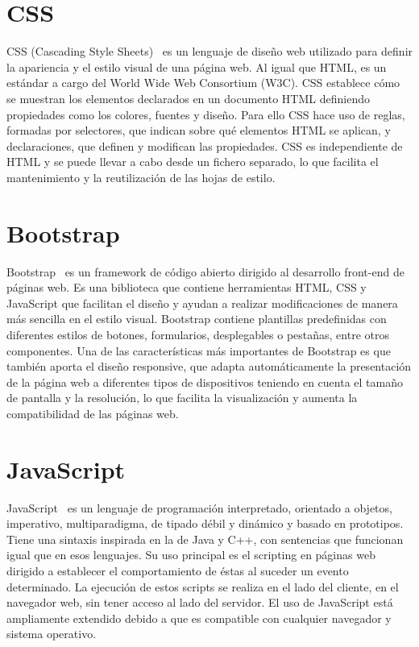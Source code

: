 \documentclass[a4paper, 12pt]{book}
\begin{document}
\section{CSS} 
\label{sec:css}

CSS (Cascading Style Sheets)~\cite{htmlcss} es un lenguaje de diseño web utilizado para definir la apariencia y el estilo visual de una página web. Al igual que HTML, es un estándar a cargo del World Wide Web Consortium (W3C).
CSS establece cómo se muestran los elementos declarados en un documento HTML definiendo propiedades como los colores, fuentes y diseño. Para ello CSS hace uso de reglas, formadas por selectores, que indican sobre qué elementos HTML se aplican, y declaraciones, que definen y modifican las propiedades.
CSS es independiente de HTML y se puede llevar a cabo desde un fichero separado, lo que facilita el mantenimiento y la reutilización de las hojas de estilo.


\section{Bootstrap} 
\label{sec:bootstrap}

Bootstrap~\cite{bootstrap} es un framework de código abierto dirigido al desarrollo front-end de páginas web. Es una biblioteca que contiene herramientas HTML, CSS y JavaScript que facilitan el diseño y ayudan a realizar modificaciones de manera más sencilla en el estilo visual. Bootstrap contiene plantillas predefinidas con diferentes estilos de botones, formularios, desplegables o pestañas, entre otros componentes. Una de las características más importantes de Bootstrap es que también aporta el diseño responsive, que adapta automáticamente la presentación de la página web a diferentes tipos de dispositivos teniendo en cuenta el tamaño de pantalla y la resolución, lo que facilita la visualización y aumenta la compatibilidad de las páginas web.

\section{JavaScript} 
\label{sec:javascript}

JavaScript~\cite{javascript} es un lenguaje de programación interpretado, orientado a objetos, imperativo, multiparadigma, de tipado débil y dinámico y basado en prototipos. Tiene una sintaxis inspirada en la de Java y C++, con sentencias que funcionan igual que en esos lenguajes.
Su uso principal es el scripting en páginas web dirigido a establecer el comportamiento de éstas al suceder un evento determinado. La ejecución de estos scripts se realiza en el lado del cliente, en el navegador web, sin tener acceso al lado del servidor.
El uso de JavaScript está ampliamente extendido debido a que es compatible con cualquier navegador y sistema operativo.
\end{document}
